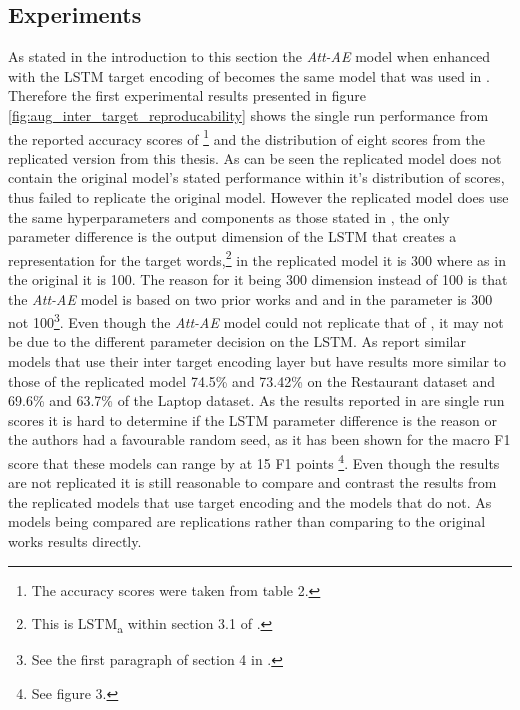 \subsection{Experiments}
As stated in the introduction to this section the \textit{Att-AE} model when enhanced with the LSTM target encoding of \citet{hazarika-etal-2018-modeling} becomes the same model that was used in \citet{hazarika-etal-2018-modeling}. Therefore the first experimental results presented in figure \ref{fig:aug_inter_target_reproducability} shows the single run performance from the reported accuracy scores of \citet{hazarika-etal-2018-modeling}\footnote{The accuracy scores were taken from table 2.} and the distribution of eight scores from the replicated version from this thesis. As can be seen the replicated model does not contain the original model's stated performance within it's distribution of scores, thus failed to replicate the original model. However the replicated model does use the same hyperparameters and components as those stated in \citet{hazarika-etal-2018-modeling}, the only parameter difference is the output dimension of the LSTM that creates a representation for the target words,\footnote{This is LSTM\textsubscript{a} within section 3.1 of \citet{hazarika-etal-2018-modeling}.} in the replicated model it is 300 where as in the original it is 100. The reason for it being 300 dimension instead of 100 is that the \textit{Att-AE} model is based on two prior works \citet{hazarika-etal-2018-modeling} and \citet{wang-etal-2016-attention} and in \citet{wang-etal-2016-attention} the parameter is 300 not 100\footnote{See the first paragraph of section 4 in \citet{wang-etal-2016-attention}.}. Even though the \textit{Att-AE} model could not replicate that of \citet{hazarika-etal-2018-modeling}, it may not be due to the different parameter decision on the LSTM. As \citet{hazarika-etal-2018-modeling} report similar models that use their inter target encoding layer but have results more similar to those of the replicated model 74.5\% and 73.42\% on the Restaurant dataset and 69.6\% and 63.7\% of the Laptop dataset. As the results reported in \citet{hazarika-etal-2018-modeling} are single run scores it is hard to determine if the LSTM parameter difference is the reason or the authors had a favourable random seed, as it has been shown for the macro F1 score that these models can range by at 15 F1 points \citep{moss-etal-2019-fiesta}\footnote{See figure 3.}. Even though the results are not replicated it is still reasonable to compare and contrast the results from the replicated models that use target encoding and the models that do not. As models being compared are replications rather than comparing to the original works results directly. 

